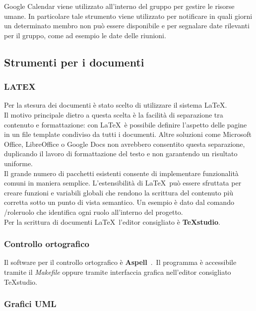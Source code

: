 Google Calendar viene utilizzato all’interno del gruppo per gestire le risorse umane. In
particolare tale strumento viene utilizzato per notificare in quali giorni un determinato
membro non pu\`{o} essere disponibile e per segnalare date rilevanti per il gruppo, come
ad esempio le date delle riunioni.



\subsection{Strumenti per i documenti}
\subsubsection{LATEX} 
 
Per la stesura dei documenti \`{e} stato scelto di utilizzare il sistema \LaTeX.\\
Il motivo 
principale dietro a questa scelta \`{e} la facilit\`{a} di separazione tra contenuto e formattazione: 
con \LaTeX\ \`{e} possibile definire l’aspetto delle pagine in un file template condiviso da tutti i documenti. Altre soluzioni come Microsoft Office, LibreOffice o Google Docs non 
avrebbero consentito questa separazione, duplicando il lavoro di formattazione del testo 
e non garantendo un risultato uniforme.\\
Il grande numero di pacchetti esistenti consente di implementare funzionalit\`{a} comuni 
in maniera semplice. L’estensibilit\`{a} di \LaTeX\ pu\`{o} essere sfruttata per creare funzioni e 
variabili globali che rendono la scrittura del contenuto pi\`{u} corretta sotto un punto di 
vista semantico. Un esempio \`{e} dato dal comando /role{ruolo} che identifica ogni ruolo 
all’interno del progetto.\\
Per la scrittura di documenti \LaTeX\  l’editor consigliato \`{e} \textbf{TeXstudio}. 

\subsubsection{Controllo ortografico}

Il software per il controllo ortografico \`{e} \textbf{Aspell}\ .\ Il programma \`{e} accessibile tramite il \emph{Makefile} oppure tramite interfaccia grafica nell’editor consigliato TeXstudio.


\subsubsection{Grafici UML} 

